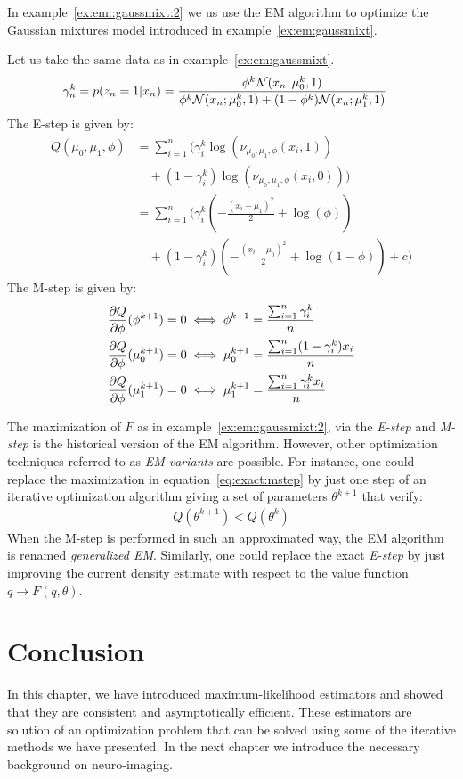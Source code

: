 In example~\ref{ex:em::gaussmixt:2} we us use the EM algorithm to optimize the Gaussian mixtures model introduced in example~\eqref{ex:em:gaussmixt}.
\begin{example}
  \label{ex:em::gaussmixt:2}
  Let us take the same data as in example~\ref{ex:em:gaussmixt}.
  \begin{align}
    \gamma_n^k = p(z_n = 1 | x_n) &= \frac{\phi^k \mathcal{N}(x_n; \mu_0^k, 1)}{ \phi^k \mathcal{N}(x_n; \mu_0^k, 1) + (1 - \phi^k) \mathcal{N}(x_n; \mu_1^k, 1)} 
  \end{align}
  The E-step is given by:
  \begin{align}
    Q(\mu_0, \mu_1, \phi) &= \sum_{i=1}^n \Big( \gamma_i^k \log(\nu_{\mu_0, \mu_1, \phi}(x_i, 1)) \\ &\enspace \enspace + (1 - \gamma_i^k) \log(\nu_{\mu_0, \mu_1, \phi}(x_i, 0)) \Big) \\
              &= \sum_{i=1}^n \Big( \gamma_i^k( -\frac{(x_i - \mu_1)^2}{2} + \log(\phi)) \\ &\enspace \enspace + (1 - \gamma_i^k) ( -\frac{(x_i - \mu_0)^2}{2} + \log(1 -\phi)) + c \Big)
 \end{align}
 The M-step is given by:
 \begin{align}
   &\frac{ \partial Q}{\partial \phi}(\phi^{k + 1}) = 0 \iff \phi^{k + 1} = \frac{\sum_{i=1}^n \gamma_i^k}{n} \\
   &\frac{ \partial Q}{\partial \phi}(\mu^{k+1}_0) = 0 \iff \mu^{k + 1}_0 = \frac{\sum_{i=1}^n (1 - \gamma_i^k) x_i}{n} \\
   &\frac{ \partial Q}{\partial \phi}(\mu^{k+1}_1) = 0 \iff \mu^{k + 1}_1 = \frac{\sum_{i=1}^n \gamma_i^k x_i}{n} \\
 \end{align}
\end{example}


The maximization of $F$ as in example~\ref{ex:em::gaussmixt:2}, via the \emph{E-step} and \emph{M-step} is the
historical version of the EM algorithm. However, other optimization techniques
referred to as \emph{EM variants}
are possible. For instance, one could replace the maximization in
equation~\eqref{eq:exact:mstep} by just one step of an iterative optimization
algorithm giving a set of parameters $\theta^{k+1}$ that verify:
\begin{align}
  Q(\theta^{k+1}) < Q(\theta^k) 
\end{align}
When the M-step is performed in such an approximated way, the EM algorithm
is renamed \emph{generalized EM}.
Similarly, one could replace the exact \emph{E-step} by just improving the
current density estimate with respect to the value function $q \rightarrow F(q,
\theta)$.

\section{Conclusion}
In this chapter, we have introduced maximum-likelihood estimators and showed
that they are consistent and asymptotically efficient. These estimators are
solution of an optimization problem that can be solved using some of the
iterative methods we have presented.
In the next chapter we introduce the necessary background on neuro-imaging.
